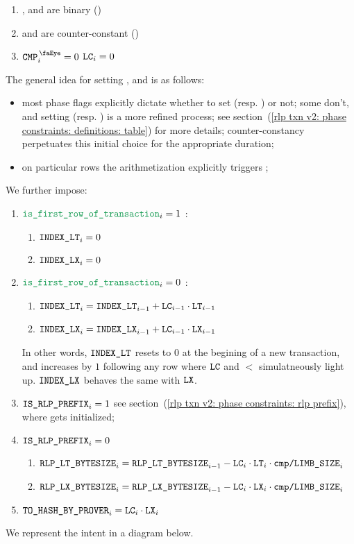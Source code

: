 \begin{enumerate}
    \item \lc{}, \lt{} and \lx{} are binary \quad (\sanityCheck)
    \item \lt{} and \lx{} are counter-constant \quad (\sanityCheck)
    \item \If $\isCmp  _{i} = 0$ \Then $\texttt{LC} _{i} = 0$
\end{enumerate}
\saNote{}
The general idea for setting \lc{}, \lt{} and \lx{} is as follows:
\begin{itemize}
    \item
        most phase flags explicitly dictate whether to set \lt{} (resp. \lx{}) or not;
        some don't, and setting \lt{} (resp. \lx{}) is a more refined process;
        see section~(\ref{rlp txn v2: phase constraints: definitions: table})
        for more details;
        counter-constancy perpetuates this initial choice for the appropriate duration;
    \item
        on particular rows the arithmetization explicitly triggers \lc{};
\end{itemize}

\noindent We further impose:
\begin{enumerate}
    \item \If $\locIsFirstRowOfTransaction _{i} = 1$ \Then:
        \begin{enumerate}
            \item $\texttt{INDEX\_LT} _{i} = 0$
            \item $\texttt{INDEX\_LX} _{i} = 0$
        \end{enumerate}
    \item \If $\locIsFirstRowOfTransaction _{i} = 0$ \Then:
        \begin{enumerate}
            \item $\texttt{INDEX\_LT} _{i} = \texttt{INDEX\_LT} _{i - 1} + \texttt{LC} _{i - 1} \cdot \texttt{LT} _{i - 1}$
            \item $\texttt{INDEX\_LX} _{i} = \texttt{INDEX\_LX} _{i - 1} + \texttt{LC} _{i - 1} \cdot \texttt{LX} _{i - 1}$
        \end{enumerate}
        \saNote{}
        In other words, $\texttt{INDEX\_LT}$ resets to $0$ at the begining of a new transaction,
        and increases by $1$ following any row where $\texttt{LC}$ and $\lt$ simulatneously light up.
        $\texttt{INDEX\_LX}$ behaves the same with $\texttt{LX}$.
    \item \If $\texttt{IS\_RLP\_PREFIX} _{i} = 1$ \Then
        see section~(\ref{rlp txn v2: phase constraints: rlp prefix}),
        where \phaseRlpPrefix{} gets initialized;
    \item \If $\texttt{IS\_RLP\_PREFIX} _{i} = 0$ \Then
        \begin{enumerate}
            \item $\texttt{RLP\_LT\_BYTESIZE} _{i} = \texttt{RLP\_LT\_BYTESIZE} _{i - 1} - \texttt{LC} _{i} \cdot \texttt{LT} _{i} \cdot\texttt{cmp}\texttt{/}\texttt{{LIMB\_SIZE}} _{i}$
            \item $\texttt{RLP\_LX\_BYTESIZE} _{i} = \texttt{RLP\_LX\_BYTESIZE} _{i - 1} - \texttt{LC} _{i} \cdot \texttt{LX} _{i} \cdot\texttt{cmp}\texttt{/}\texttt{{LIMB\_SIZE}} _{i}$
        \end{enumerate}
    \item $\texttt{TO\_HASH\_BY\_PROVER} _{i} = \texttt{LC} _{i} \cdot \texttt{LX} _{i}$
\end{enumerate}
We represent the intent in a diagram below.


